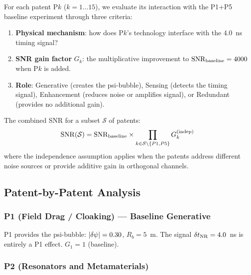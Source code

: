 For each patent P$k$ ($k = 1\ldots 15$), we evaluate its interaction with
the P1+P5 baseline experiment through three criteria:
\begin{enumerate}[nosep]
\item \textbf{Physical mechanism}: how does P$k$'s technology interface
  with the 4.0~ns timing signal?
\item \textbf{SNR gain factor} $G_k$: the multiplicative improvement to
  $\mathrm{SNR}_{\rm baseline} = 4000$ when P$k$ is added.
\item \textbf{Role}: Generative (creates the psi-bubble), Sensing
  (detects the timing signal), Enhancement (reduces noise or amplifies
  signal), or Redundant (provides no additional gain).
\end{enumerate}

The combined SNR for a subset $\mathcal{S}$ of patents:
\begin{equation}
\mathrm{SNR}(\mathcal{S}) = \mathrm{SNR}_{\rm baseline}
\times \prod_{k \in \mathcal{S}\setminus\{P1,P5\}} G_k^{(\rm indep)}
\label{eq:combined_SNR}
\end{equation}
where the independence assumption applies when the patents address
different noise sources or provide additive gain in orthogonal channels.

\subsection{Patent-by-Patent Analysis}
\label{ssec:patent_analysis}

\subsubsection*{P1 (Field Drag / Cloaking) --- Baseline Generative}

P1 provides the psi-bubble: $|\delta\psi| = 0.30$, $R_b = 5$~m. The signal
$\delta t_{\rm NR} = 4.0$~ns is entirely a P1 effect. $G_1 = 1$ (baseline).

\subsubsection*{P2 (Resonators and Metamaterials)}

